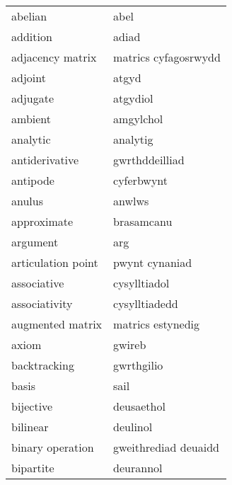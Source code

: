 \begin{supertabular}{p{0.22\textwidth}p{0.22\textwidth}}
                          abelian &                             abel \\
                         addition &                            adiad \\
                 adjacency matrix &             matrics cyfagosrwydd \\
                          adjoint &                            atgyd \\
                         adjugate &                         atgydiol \\
                          ambient &                        amgylchol \\
                         analytic &                         analytig \\
                   antiderivative &                   gwrthddeilliad \\
                         antipode &                       cyferbwynt \\
                           anulus &                           anwlws \\
                      approximate &                       brasamcanu \\
                         argument &                              arg \\
               articulation point &                   pwynt cynaniad \\
                      associative &                     cysylltiadol \\
                    associativity &                    cysylltiadedd \\
                 augmented matrix &                matrics estynedig \\
                            axiom &                           gwireb \\
                     backtracking &                       gwrthgilio \\
                            basis &                             sail \\
                        bijective &                       deusaethol \\
                         bilinear &                         deulinol \\
                 binary operation &             gweithrediad deuaidd \\
                        bipartite &                        deurannol \\

\end{supertabular}
